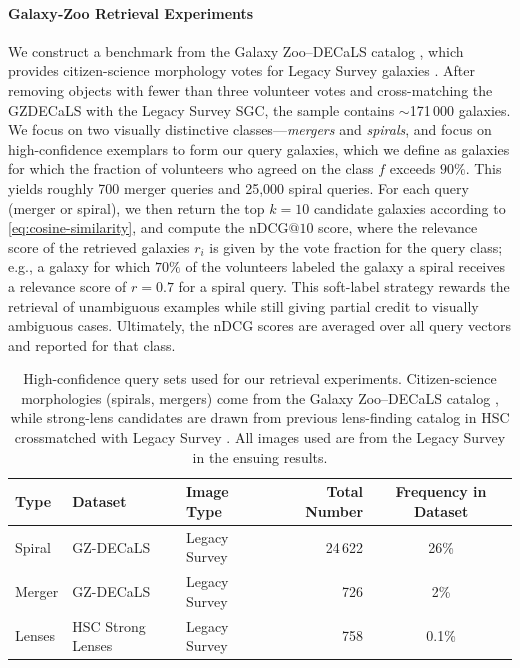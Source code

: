 \documentclass[]{polymathic}
\begin{document}
\paragraph{Galaxy‑Zoo Retrieval Experiments} We construct a benchmark from the Galaxy Zoo–DECaLS catalog \citep[GZ-DECaLS;][]{walmsley2022galaxy}, which provides citizen-science morphology votes for Legacy Survey galaxies \citep{dey2019overview}. After removing objects with fewer than three volunteer votes and cross-matching the GZDECaLS with the Legacy Survey SGC, the sample contains $\sim$171\,000 galaxies. We focus on two visually distinctive classes—\emph{mergers} and \emph{spirals}, and focus on high-confidence exemplars to form our query galaxies, which we define as galaxies for which the fraction of volunteers who agreed on the class $f$ exceeds $90\%$. This yields roughly 700 merger queries and 25,000 spiral queries. For each query (merger or spiral), we then return the top $k=10$ candidate galaxies according to \autoref{eq:cosine-similarity}, and compute the $\mathrm{nDCG@}10$ score, where the relevance score of the retrieved galaxies $r_i$ is given by the vote fraction for the query class; e.g., a galaxy for which $70\%$ of the volunteers labeled the galaxy a spiral receives a relevance score of $r\!=\!0.7$ for a spiral query. This soft-label strategy rewards the retrieval of unambiguous examples while still giving partial credit to visually ambiguous cases. Ultimately, the nDCG scores are averaged over all query vectors and reported for that class.

\begin{table}
  \centering
  \small
  \begin{tabular}{l l l r c}
    \toprule
    Type   & Dataset          & Image Type    & Total Number & Frequency in Dataset \\ 
    \midrule
    Spiral & GZ-DECaLS      & Legacy Survey      & 24\,622 & 26\% \\
    Merger & GZ-DECaLS     & Legacy Survey       & 726     & 2\%  \\
    \midrule
    Lenses & HSC Strong Lenses  & Legacy Survey  & 758     & 0.1\% \\
    \bottomrule
  \end{tabular}
  \caption{High-confidence query sets used for our retrieval experiments.  
           Citizen-science morphologies (spirals, mergers) come from the Galaxy Zoo–DECaLS catalog \citep{walmsley2022galaxy}, while strong-lens candidates are drawn from previous lens-finding catalog in HSC crossmatched with Legacy Survey \citep{SUGOHI_X}. All images used are from the Legacy Survey in the ensuing results.}
  \label{tab:retrieval_query_stats}
\end{table}
\end{document}
